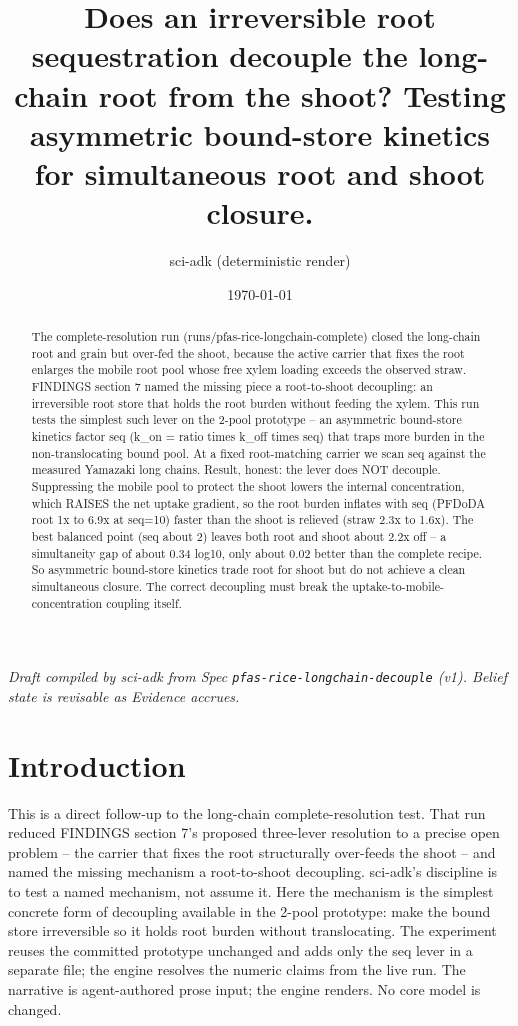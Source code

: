 \documentclass{article}
\title{Does an irreversible root sequestration decouple the long-chain root from the shoot? Testing asymmetric bound-store kinetics for simultaneous root and shoot closure.}
\author{sci-adk (deterministic render)}
\date{\today}
\begin{document}
\maketitle

\noindent\textit{Draft compiled by sci-adk from Spec \texttt{pfas-rice-longchain-decouple} (v1). Belief state is revisable as Evidence accrues.}

\begin{abstract}
The complete-resolution run (runs/pfas-rice-longchain-complete) closed the long-chain root and grain but over-fed the shoot, because the active carrier that fixes the root enlarges the mobile root pool whose free xylem loading exceeds the observed straw. FINDINGS section 7 named the missing piece a root-to-shoot decoupling: an irreversible root store that holds the root burden without feeding the xylem. This run tests the simplest such lever on the 2-pool prototype -- an asymmetric bound-store kinetics factor seq (k\_on = ratio times k\_off times seq) that traps more burden in the non-translocating bound pool. At a fixed root-matching carrier we scan seq against the measured Yamazaki long chains. Result, honest: the lever does NOT decouple. Suppressing the mobile pool to protect the shoot lowers the internal concentration, which RAISES the net uptake gradient, so the root burden inflates with seq (PFDoDA root 1x to 6.9x at seq=10) faster than the shoot is relieved (straw 2.3x to 1.6x). The best balanced point (seq about 2) leaves both root and shoot about 2.2x off -- a simultaneity gap of about 0.34 log10, only about 0.02 better than the complete recipe. So asymmetric bound-store kinetics trade root for shoot but do not achieve a clean simultaneous closure. The correct decoupling must break the uptake-to-mobile-concentration coupling itself.
\end{abstract}

\section{Introduction}
This is a direct follow-up to the long-chain complete-resolution test. That run reduced FINDINGS section 7's proposed three-lever resolution to a precise open problem -- the carrier that fixes the root structurally over-feeds the shoot -- and named the missing mechanism a root-to-shoot decoupling. sci-adk's discipline is to test a named mechanism, not assume it. Here the mechanism is the simplest concrete form of decoupling available in the 2-pool prototype: make the bound store irreversible so it holds root burden without translocating. The experiment reuses the committed prototype unchanged and adds only the seq lever in a separate file; the engine resolves the numeric claims from the live run. The narrative is agent-authored prose input; the engine renders. No core model is changed.
\end{document}
